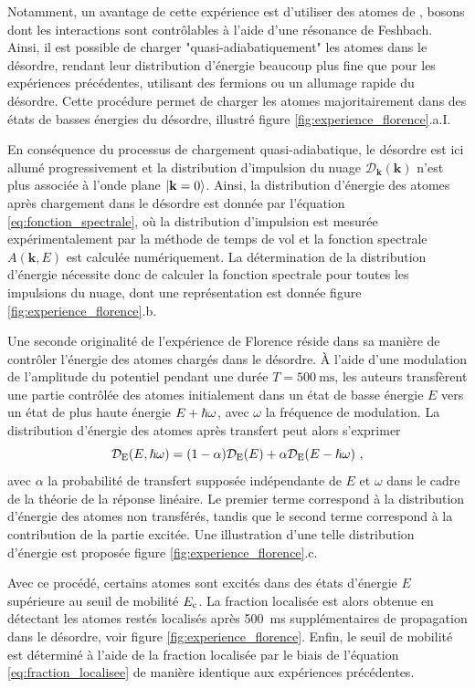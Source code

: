 Notamment, un avantage de cette expérience est d'utiliser des atomes de , bosons dont les interactions sont contrôlables à l'aide d'une résonance de Feshbach. Ainsi, il est possible de charger "quasi-adiabatiquement" les atomes dans le désordre, rendant leur distribution d'énergie beaucoup plus fine que pour les expériences précédentes, utilisant des fermions ou un allumage rapide du désordre. Cette procédure permet de charger les atomes majoritairement dans des états de basses énergies du désordre, illustré figure \ref{fig:experience_florence}.a.I.

En conséquence du processus de chargement quasi-adiabatique, le désordre est ici allumé progressivement et la distribution d'impulsion du nuage $\mathcal{D}_{\mathbf{k}}(\mathbf{k})$ n'est plus associée à l'onde plane $\left| \mathbf{k}=0 \right\rangle$. Ainsi, la distribution d'énergie des atomes après chargement dans le désordre est donnée par l'équation \ref{eq:fonction_spectrale}, où la distribution d'impulsion est mesurée expérimentalement par la méthode de temps de vol et la fonction spectrale $A(\mathbf{k},E)$ est calculée numériquement. La détermination de la distribution d'énergie nécessite donc de calculer la fonction spectrale pour toutes les impulsions du nuage, dont une représentation est donnée figure \ref{fig:experience_florence}.b.

Une seconde originalité de l'expérience de Florence réside dans sa manière de contrôler l'énergie des atomes chargés dans le désordre. À l'aide d'une modulation de l'amplitude du potentiel pendant une durée $T=\SI{500}{\milli\second}$, les auteurs transfèrent une partie contrôlée des atomes initialement dans un état de basse énergie $E$ vers un état de plus haute énergie $E+\hslash\omega$, avec $\omega$ la fréquence de modulation. La distribution d'énergie des atomes après transfert peut alors s'exprimer
\begin{equation}
\mathcal{D}_{\mathrm{E}}(E,\hslash\omega)=(1-\alpha)\mathcal{D}_{\mathrm{E}}(E)+\alpha \mathcal{D}_{\mathrm{E}}(E-\hslash\omega) \text{ ,}
\end{equation}
avec $\alpha$ la probabilité de transfert supposée indépendante de $E$ et $\omega$ dans le cadre de la théorie de la réponse linéaire. Le premier terme correspond à la distribution d'énergie des atomes non transférés, tandis que le second terme correspond à la contribution de la partie excitée. Une illustration d'une telle distribution d'énergie est proposée figure \ref{fig:experience_florence}.c.

Avec ce procédé, certains atomes sont excités dans des états d'énergie $E$ supérieure au seuil de mobilité $E_{\mathrm{c}}$. La fraction localisée est alors obtenue en détectant les atomes restés localisés après \SI{500}{\milli\second} supplémentaires de propagation dans le désordre, voir figure \ref{fig:experience_florence}. Enfin, le seuil de mobilité est déterminé à l'aide de la fraction localisée par le biais de l'équation \ref{eq:fraction_localisee} de manière identique aux expériences précédentes.

